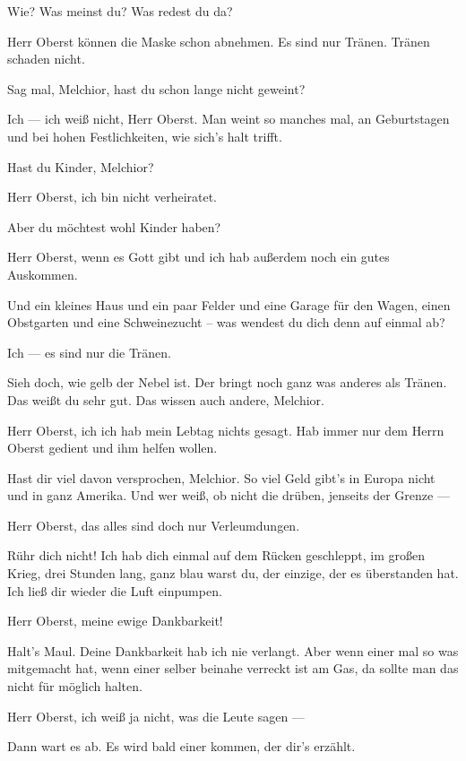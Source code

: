 \documentclass[
	final,
	a4paper,
	ngerman,
	mpinclude = true, %
	twoside = true,
	open = right,
	cleardoublepage = plain,
	DIV = 13,
	BCOR = 1cm,
	titlepage = firstiscover,
	]{scrbook}
\newcommand{\thecharacter}[1]{\textup{\textsc{#1}}\xspace}
\newcommand{\theBrix}{\thecharacter{Oberst~Brix}}
\newcommand{\theMelchior}{\thecharacter{Melchior}}
\newcommand{\character}[1]{\item[#1]}
\newcommand{\Brix}{\character{\theBrix}}
\newcommand{\Melchior}{\character{\theMelchior}}
\begin{document}
\begin{play}

\Brix
Wie? Was meinst du? Was redest du da?

\Melchior
Herr Oberst können die Maske schon abnehmen. Es sind nur Tränen. Tränen schaden nicht.

\Brix
Sag mal, Melchior, hast du schon lange nicht geweint?

\Melchior
Ich --- ich weiß nicht, Herr Oberst. Man weint so manches mal, an Geburtstagen und bei hohen Festlichkeiten, wie sich's halt trifft.

\Brix
Hast du Kinder, Melchior?

\Melchior
Herr Oberst, ich bin nicht verheiratet.

\Brix
Aber du möchtest wohl Kinder haben?

\Melchior
Herr Oberst, wenn es Gott gibt und ich hab außerdem noch ein gutes Auskommen.

\Brix
Und ein kleines Haus und ein paar Felder und eine Garage für den Wagen, einen Obstgarten und eine Schweinezucht -- was wendest du dich denn auf einmal ab?

\Melchior
Ich --- es sind nur die Tränen.

\Brix
Sieh doch, wie gelb der Nebel ist. Der bringt noch ganz was anderes als Tränen. Das weißt du sehr gut. Das wissen auch andere, Melchior.

\Melchior
Herr Oberst, ich ich hab mein Lebtag nichts gesagt. Hab immer nur dem Herrn Oberst gedient und ihm helfen wollen.

\Brix
Hast dir viel davon versprochen, Melchior. So viel Geld gibt's in Europa nicht und in ganz Amerika. Und wer weiß, ob nicht die drüben, jenseits der Grenze ---

\Melchior
Herr Oberst, das alles sind doch nur Verleumdungen.

\Brix
Rühr dich nicht! Ich hab dich einmal auf dem Rücken geschleppt, im großen Krieg, drei Stunden lang, ganz blau warst du, der einzige, der es überstanden hat. Ich ließ dir wieder die Luft einpumpen.

\Melchior
Herr Oberst, meine ewige Dankbarkeit!

\Brix
Halt's Maul. Deine Dankbarkeit hab ich nie verlangt. Aber wenn einer mal so was mitgemacht hat, wenn einer selber beinahe verreckt ist am Gas, da sollte man das nicht für möglich halten.

\Melchior
Herr Oberst, ich weiß ja nicht, was die Leute sagen ---

\Brix
Dann wart es ab. Es wird bald einer kommen, der dir's erzählt.


\end{play}
\end{document}
